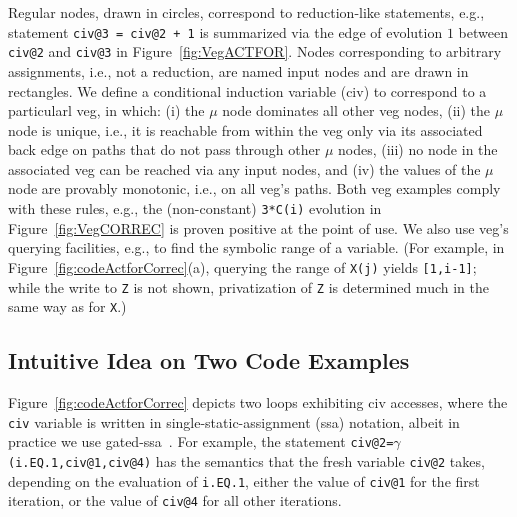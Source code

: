 \documentclass{sig-alternate}
\begin{document}
Regular nodes, drawn in circles, correspond to reduction-like statements,
e.g., statement {\tt civ@3 = civ@2 + 1} is summarized via the edge 
of evolution $1$ between {\tt civ@2} and {\tt civ@3} in Figure~\ref{fig:VegACTFOR}. 
Nodes corresponding to arbitrary assignments, i.e., not a reduction, are
named input nodes and are drawn in rectangles. 
%
We define a conditional induction variable ({\sc civ}) to correspond to a
particularl {\sc veg}, in which:
(i)   the $\mu$ node dominates all other {\sc veg} nodes,
(ii)  the $\mu$ node is unique, i.e., it is reachable from within the {\sc veg} 
        only via its associated back edge on paths that do not pass through other 
        $\mu$ nodes,
(iii)  no node in the associated {\sc veg} can be reached via any input nodes, and 
(iv) the values of the $\mu$ node are provably monotonic, i.e., on all {\sc veg}'s paths.
Both {\sc veg} examples comply with these rules, e.g., the (non-constant) {\tt 3*C(i)} evolution 
in Figure~\ref{fig:VegCORREC} is proven positive at the point of use.
%
We also use {\sc veg}'s querying facilities, e.g., 
to find the symbolic range of a variable.
(For example, in Figure~\ref{fig:codeActforCorrec}(a), querying the range 
of {\tt X(j)} yields {\tt[1,i-1]}; while the write to {\tt Z} is not shown,
privatization of {\tt Z} is determined much in the same way as for {\tt X}.)


\subsection{Intuitive Idea on Two Code Examples}
\label{Intro:RelAppLim}

Figure~\ref{fig:codeActforCorrec} depicts two loops
exhibiting {\sc civ} accesses, where the {\tt civ} variable 
is written in single-static-assignment ({\sc ssa}) notation, albeit 
in practice we use gated-{\sc ssa}~\cite{GatedSSA}. 
%
For example, the statement {\tt civ@2=$\gamma$(i.EQ.1,civ@1,civ@4)}
has the semantics that the fresh variable {\tt civ@2} takes, depending 
on the evaluation of {\tt i.EQ.1}, either the value 
of {\tt civ@1} for the first iteration, or the value of 
{\tt civ@4} for all other iterations.
\end{document}
